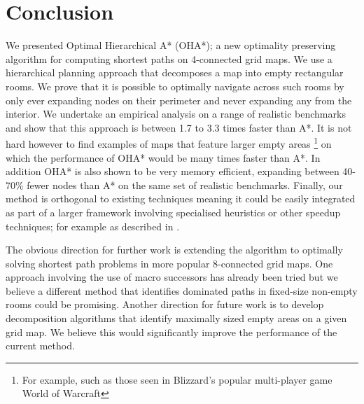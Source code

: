 \section{Conclusion}
We presented Optimal Hierarchical A* (OHA*); a new optimality preserving algorithm for 
computing shortest paths on 4-connected grid maps.
We use a hierarchical planning approach that decomposes a map into empty rectangular rooms.
We prove that it is possible to optimally navigate across such rooms by only ever
expanding nodes on their perimeter and never expanding any from the interior.
We undertake an empirical analysis on a range of realistic benchmarks and show that
this approach is between 1.7 to 3.3 times faster than A*.
It is not hard however to find examples of maps that feature larger empty areas
\footnote{For example, such as those seen in Blizzard's popular multi-player game World of Warcraft} 
on which the performance of OHA* would be many times faster than A*.
In addition OHA* is also shown to be very memory efficient,
expanding between 40-70\% fewer nodes than A* on the same set of realistic benchmarks.
Finally, our method is orthogonal to existing techniques meaning it could be easily integrated
as part of a larger framework involving specialised heuristics or other speedup techniques; 
for example as described in \cite{bjornsson05,bjornsson06}. 
\par
The obvious direction for further work is extending the algorithm to optimally solving 
shortest path problems in more popular 8-connected grid maps. 
One approach involving the use of macro successors has already been tried 
\cite{bolanca09} but we believe a different method that identifies 
dominated paths in fixed-size non-empty rooms could be promising. 
Another direction for future work is to develop decomposition algorithms that identify maximally
sized empty areas on a given grid map.
We believe this would significantly improve the performance of the current method.
